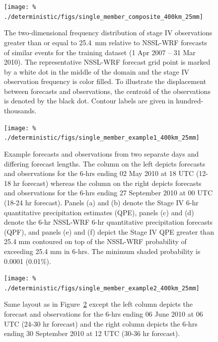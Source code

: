 \clearpage
\begin{figure}[cc]
    \centering
    \texttt{[image: \%
    ./deterministic/figs/single\_member\_composite\_400km\_25mm]}\\
    \caption{The two-dimensional frequency distribution of stage IV observations greater than or equal to \mbox{25.4 mm} relative to NSSL-WRF forecasts of similar events for the training dataset (1 Apr 2007 -- 31 Mar 2010).
    The representative NSSL-WRF forecast grid point is marked by a white dot in the middle of the domain and the stage IV observation frequency is color filled.
    To illustrate the displacement between forecasts and observations, the centroid of the observations is denoted by the black dot.
    Contour labels are given in hundred-thousands.}
    \label{single_25comp}
\end{figure}


\clearpage
\begin{figure}[cc]
    \centering
    \texttt{[image: \%
    ./deterministic/figs/single\_member\_example1\_400km\_25mm]}\\
    \caption{Example forecasts and observations from two separate days and differing forecast lengths.
    The column on the left depicts forecasts and observations for the 6-hrs ending 02 May 2010 at 18 UTC (12-18 hr forecast) whereas the column on the right depicts forecasts and observations for the 6-hrs ending 27 September 2010 at 00 UTC (18-24 hr forecast).
    Panels (a) and (b) denote the Stage IV 6-hr quantitative precipitation estimates (QPE), panels (c) and (d) denote the 6-hr NSSL-WRF 6-hr quantitative precipitation forecasts (QPF), and panels (e) and (f) depict the Stage IV QPE greater than 25.4 mm contoured on top of the NSSL-WRF probability of exceeding 25.4 mm in 6-hrs. The minimum shaded probability is 0.0001 (0.01\%).}
    \label{single_1_400km_25mm}
\end{figure}


\clearpage
\begin{figure}[cc]
    \centering
    \texttt{[image: \%
    ./deterministic/figs/single\_member\_example2\_400km\_25mm]}\\
    \caption{Same layout as in \mbox{Figure \ref{single_1_400km_25mm}} except the left column depicts the forecast and observations for the 6-hrs ending 06 June 2010 at 06 UTC (24-30 hr forecast) and the right column depicts the 6-hrs ending 30 September 2010 at 12 UTC (30-36 hr forecast).}
    \label{single_2_400km_25mm}
\end{figure}


